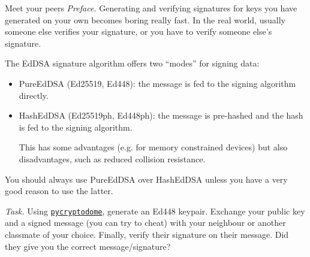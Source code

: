 \documentclass{practice}
\begin{document}
\begin{task}{Meet your peers}
  \textit{Preface.}
  Generating and verifying signatures for keys you have generated on your own becomes boring really fast.
  In the real world, usually someone else verifies your signature, or you have to verify someone else's signature.

  The EdDSA signature algorithm offers two \enquote{modes}\footnotemark{} for signing data:
  \begin{itemize}
    \item PureEdDSA (Ed25519, Ed448): the message is fed to the signing algorithm directly.
    \item HashEdDSA (Ed25519ph, Ed448ph): the message is pre-hashed and the hash is fed to the signing algorithm.
    
    This has some advantages (e.g. for memory constrained devices) but also disadvantages, such as reduced collision resistance.
  \end{itemize}
  You should always use PureEdDSA over HashEdDSA unless you have a very good reason to use the latter.

  \textit{Task.}
  Using \href{https://pycryptodome.readthedocs.io/en/latest/src/signature/eddsa.html}{\texttt{pycryptodome}}, generate an Ed448 keypair.
  Exchange your public key and a signed message (you can try to cheat) with your neighbour or another classmate of your choice.
  Finally, verify their signature on their message.
  Did they give you the correct message/signature?
\end{task}

\newpage
\end{document}
